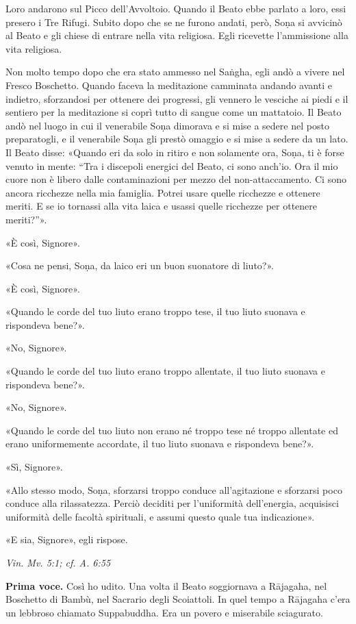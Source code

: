 Loro andarono sul Picco dell’Avvoltoio. Quando il Beato ebbe parlato a
loro, essi presero i Tre Rifugi. Subito dopo che se ne furono andati,
però, Soṇa si avvicinò al Beato e gli chiese di entrare nella vita
religiosa. Egli ricevette l’ammissione alla vita religiosa.


Non molto tempo dopo che era stato ammesso nel Saṅgha, egli andò a
vivere nel Fresco Boschetto. Quando faceva la meditazione camminata
andando avanti e indietro, sforzandosi per ottenere dei progressi, gli
vennero le vesciche ai piedi e il sentiero per la meditazione si coprì
tutto di sangue come un mattatoio. Il Beato andò nel luogo in cui il
venerabile Soṇa dimorava e si mise a sedere nel posto preparatogli, e il
venerabile Soṇa gli prestò omaggio e si mise a sedere da un lato. Il
Beato disse: «Quando eri da solo in ritiro e non solamente ora, Soṇa, ti
è forse venuto in mente: “Tra i discepoli energici del Beato, ci sono
anch’io. Ora il mio cuore non è libero dalle contaminazioni per mezzo
del non-attaccamento. Ci sono ancora ricchezze nella mia famiglia.
Potrei usare quelle ricchezze e ottenere meriti. E se io tornassi alla
vita laica e usassi quelle ricchezze per ottenere meriti?”».


«È così, Signore».


«Cosa ne pensi, Soṇa, da laico eri un buon suonatore di liuto?».


«È così, Signore».


«Quando le corde del tuo liuto erano troppo tese, il tuo liuto suonava e
rispondeva bene?».


«No, Signore».


«Quando le corde del tuo liuto erano troppo allentate, il tuo liuto
suonava e rispondeva bene?».


«No, Signore».


«Quando le corde del tuo liuto non erano né troppo tese né troppo
allentate ed erano uniformemente accordate, il tuo liuto suonava e
rispondeva bene?».


«Sì, Signore».


«Allo stesso modo, Soṇa, sforzarsi troppo conduce all’agitazione e
sforzarsi poco conduce alla rilassatezza. Perciò deciditi per
l’uniformità dell’energia, acquisisci uniformità delle facoltà
spirituali, e assumi questo quale tua indicazione».


«E sia, Signore», egli rispose.


\emph{Vin. Mv. 5:1; cf. A. 6:55}


\textbf{Prima voce.} Così ho udito. Una volta il Beato soggiornava a Rājagaha,
nel Boschetto di Bambù, nel Sacrario degli Scoiattoli. In quel tempo a
Rājagaha c’era un lebbroso chiamato Suppabuddha. Era un povero e
miserabile sciagurato.


